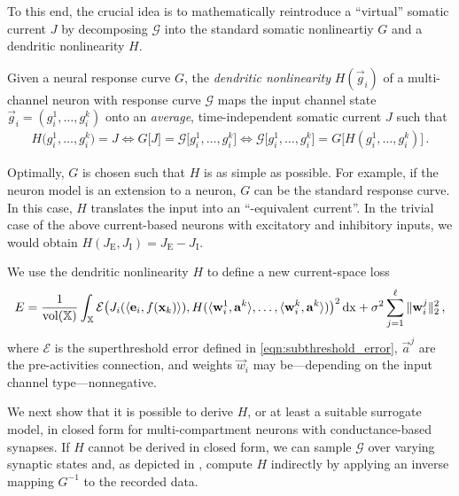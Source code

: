 To this end, the crucial idea is to mathematically reintroduce a \enquote{virtual} somatic current $J$ by decomposing $\mathscr{G}$ into the standard somatic nonlineartiy $G$ and a dendritic nonlinearity $H$.

\begin{definition}
\label{def:dendritic_nonlinearity}
Given a neural response curve $G$, the \emph{dendritic nonlinearity} $H(\vec g_i)$ of a multi-channel neuron with response curve $\mathscr{G}$ maps the input channel state $\vec g_i = (g^1_i, \ldots, g^k_i)$ onto an \emph{average}, time-independent somatic current $J$ such that
\begin{align}
		H\big(g^1_i, \ldots, g^k_i\big) = J
	\Leftrightarrow
		G\big[J\big] = \mathscr{G}\big[g^1_i, \ldots, g^k_i\big] 
	\Leftrightarrow
		\mathscr{G}\big[g^1_i, \ldots, g^k_i\big] = G\big[H(g^1_i, \ldots, g^k_i)\big] \,.
	\label{eqn:def_h}
\end{align}
\end{definition}
Optimally, $G$ is chosen such that $H$ is as simple as possible.
For example, if the neuron model is an extension to a \LIF neuron, $G$ can be the standard \LIF response curve.
In this case, $H$ translates the input into an \enquote{\LIF-equivalent current}.
In the trivial case of the above current-based \LIF neurons with excitatory and inhibitory inputs, we would obtain $H(J_\mathrm{E}, J_\mathrm{I}) = J_\mathrm{E} - J_\mathrm{I}$.

We use the dendritic nonlinearity $H$ to define a new current-space loss
\begin{align}
	E = \frac{1}{\operatorname{vol}(\mathbb{X})} \int_{\mathbb{X}}
		\mathcal{E} \bigl(
			J_i(\langle \mathbf{e}_i, f(\mathbf{x}_k) \rangle),
			H(\langle \mathbf{w}^1_i, \mathbf{a}^k \rangle, \ldots, \langle \mathbf{w}^k_i, \mathbf{a}^k \rangle)
		\bigr)^2 \,\mathrm{dx} + \sigma^2 \sum_{j = 1}^\ell \| \mathbf{w}^j_i \|_2^2\,,
\label{eqn:decode_nonlinear_synapses}
\end{align}
where $\mathcal{E}$ is the superthreshold error defined in \cref{eqn:subthreshold_error}, $\vec a^j$ are the pre-activities connection, and weights $\vec w_i$ may be---depending on the input channel type---nonnegative.

We next show that it is possible to derive $H$, or at least a suitable surrogate model, in closed form for multi-compartment \LIF neurons with conductance-based synapses.
If $H$ cannot be derived in closed form, we can sample $\mathscr{G}$ over varying synaptic states and, as depicted in , compute $H$ indirectly by applying an inverse mapping $G^{-1}$ to the recorded data.
